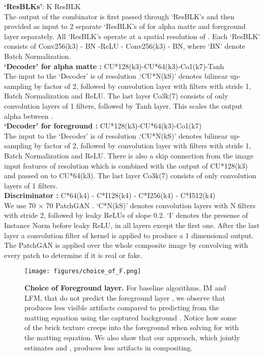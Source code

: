 \documentclass[10pt,twocolumn,letterpaper]{article}
\begin{document}
\noindent
\textbf{`ResBLKs'}: K ResBLK \\
The output of the combinator is first passed through  `ResBLK's and then provided as input to 2 separate `ResBLK's of  for alpha matte and foreground layer separately. All `ResBLK's operate at a spatial resolution of . Each `ResBLK' consists of Conv256(k3) - BN -ReLU - Conv256(k3) - BN, where `BN' denote Batch Normalization.\\

\noindent
\textbf{`Decoder' for alpha matte :} CU*128(k3)-CU*64(k3)-Co1(k7)-Tanh\\
The input to the `Decoder' is of resolution .`CU*N(kS)' denotes bilinear up-sampling by factor of 2, followed by convolution layer with   filters with stride 1, Batch Normalization and ReLU. The last layer Co3k(7) consists of only convolution layers of 1  filters, followed by Tanh layer. This scales the output alpha between .\\

\noindent
\textbf{`Decoder' for foreground :} CU*128(k3)-CU*64(k3)-Co1(k7)\\
The input to the `Decoder' is of resolution .`CU*N(kS)' denotes bilinear up-sampling by factor of 2, followed by convolution layer with   filters with stride 1, Batch Normalization and ReLU. There is also a skip connection from the image input features of resolution  which is combined with the output of CU*128(k3) and passed on to CU*64(k3). The last layer Co3k(7) consists of only convolution layers of 1  filters.\\

\noindent
\textbf{Discriminator : } C*64(k4) - C*I128(k4) - C*I256(k4) - C*I512(k4)\\
We use 70 × 70 PatchGAN \cite{isola2017image}. `C*N(kS)' denotes convolution layers with N  filters with stride 2, followed by leaky ReLUs of slope 0.2. `I' denotes the presense of Instance Norm before leaky ReLU, in all layers except the first one. After the last layer a convolution filter of kernel  is applied to produce a 1 dimensional output. The PatchGAN is applied over the whole composite image by convolving with every  patch to determine if it is real or fake.

\begin{figure*}[!ht]
	\centering
	\texttt{[image: figures/choice\_of\_F.png]}    \caption{\small \textbf{Choice of Foreground layer.} For baseline algorithms, IM and LFM, that do not predict the foreground layer , we observe that  produces less visible artifacts compared to predicting  from the matting equation using the captured background . Notice how some of the brick texture creeps into the foreground when solving for  with the matting equation.  We also show that our approach, which jointly estimates  and , produces less artifacts in compositing.} 
\label{fig:choiceF}
\end{figure*}
\end{document}
